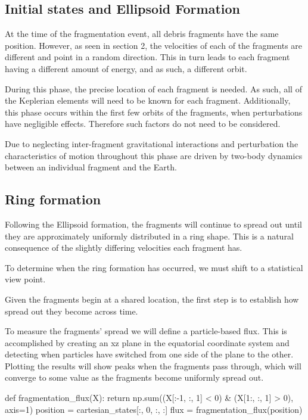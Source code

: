 \documentclass{article}
\newenvironment{code}{\captionsetup{type=listing}}{}
\begin{document}
\subsection{Initial states and Ellipsoid Formation}

At the time of the fragmentation event, all debris fragments have the same position. However, as seen in section 2, the velocities of each of the fragments are different and point in a random direction. This in turn leads to each fragment having a different amount of energy, and as such, a different orbit. 

During this phase, the precise location of each fragment is needed. As such,  all of the Keplerian elements will need to be known for each fragment. Additionally, this phase occurs within the first few orbits of the fragments, when perturbations have negligible effects. Therefore such factors do not need to be considered.

Due to neglecting inter-fragment gravitational interactions and perturbation the characteristics of motion throughout this phase are driven by two-body dynamics between an individual fragment and the Earth.

\subsection{Ring formation}

Following the Ellipsoid formation, the fragments will continue to spread out until they are approximately uniformly distributed in a ring shape. This is a natural consequence of the slightly differing velocities each fragment has. 

To determine when the ring formation has occurred, we must shift to a statistical view point.

Given the fragments begin at a shared location, the first step is to establish how spread out they become across time.

To measure the fragments' spread we will define a particle-based flux. This is accomplished by creating an xz plane in the equatorial coordinate system and detecting when particles have switched from one side of the plane to the other. Plotting the results will show peaks when the fragments pass through, which will converge to some value as the fragments become uniformly spread out.

\begin{code}
	\begin{tcbpythoncode}
		def fragmentation_flux(X):
			return np.sum((X[:-1, :, 1] < 0) & (X[1:, :, 1] > 0), axis=1)
		position = cartesian_states[:, 0, :, :]
		flux = fragmentation_flux(position)
	\end{tcbpythoncode}
\end{code}
\end{document}
